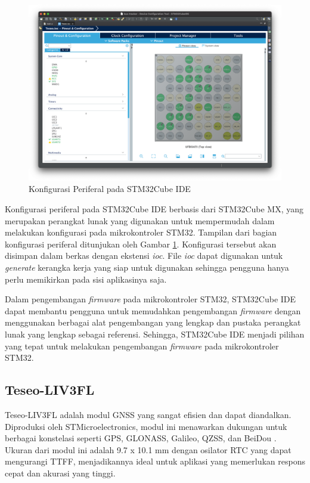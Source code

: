 \begin{figure}[H]
	\centering
	\includegraphics[width=12cm]{contents/chapter-2/stm32-mx.png}
	\caption{Konfigurasi Periferal pada STM32Cube IDE}
	\label{Fig: stm32-mx}
\end{figure}

Konfigurasi periferal pada STM32Cube IDE berbasis dari STM32Cube MX, yang merupakan perangkat lunak yang digunakan untuk mempermudah dalam melakukan konfigurasi pada mikrokontroler STM32. Tampilan dari bagian konfigurasi periferal ditunjukan oleh Gambar \ref{Fig: stm32-mx}. Konfigurasi tersebut akan disimpan dalam berkas dengan ekstensi \textit{ioc}. File \textit{ioc} dapat digunakan untuk \textit{generate} kerangka kerja yang siap untuk digunakan sehingga pengguna hanya perlu memikirkan pada sisi aplikasinya saja.

Dalam pengembangan \textit{firmware} pada mikrokontroler STM32, STM32Cube IDE dapat membantu pengguna untuk memudahkan pengembangan \textit{firmware} dengan menggunakan berbagai alat pengembangan yang lengkap dan pustaka perangkat lunak yang lengkap sebagai referensi. Sehingga, STM32Cube IDE menjadi pilihan yang tepat untuk melakukan pengembangan \textit{firmware} pada mikrokontroler STM32.

\subsection{Teseo-LIV3FL}
Teseo-LIV3FL adalah modul GNSS yang sangat efisien dan dapat diandalkan. Diproduksi oleh STMicroelectronics, modul ini menawarkan dukungan untuk berbagai konstelasi seperti GPS, GLONASS, Galileo, QZSS, dan BeiDou \cite{STMicroelectronics2022}. Ukuran dari modul ini adalah 9.7 x 10.1 mm dengan osilator RTC yang dapat mengurangi TTFF, menjadikannya ideal untuk aplikasi yang memerlukan respons cepat dan akurasi yang tinggi.

